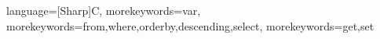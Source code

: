  {
    language=[Sharp]C,
    morekeywords={var},
    morekeywords={from,where,orderby,descending,select}, %
    morekeywords={get,set}
}

\newcommand{\CSharp}[3]{
    \kodeprintstyle{#1}{#2}{#3}{CSharp}{C\#}
}